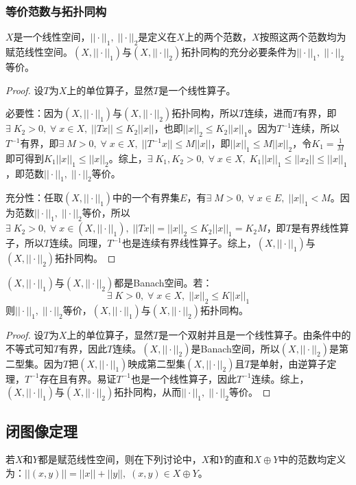 \subsubsection{等价范数与拓扑同构}
\begin{theorem}
	$X$是一个线性空间，$||\cdot||_1,\;||\cdot||_2$是定义在$X$上的两个范数，$X$按照这两个范数均为赋范线性空间。$(X,||\cdot||_1)$与$(X,||\cdot||_2)$拓扑同构的充分必要条件为$||\cdot||_1,\;||\cdot||_2$等价。
\end{theorem}
\begin{proof}
	设$T$为$X$上的单位算子，显然$T$是一个线性算子。\par
	必要性：因为$(X,||\cdot||_1)$与$(X,||\cdot||_2)$拓扑同构，所以$T$连续，进而$T$有界，即$\exists\;K_2>0,\;\forall\;x\in X,\;||Tx||\leqslant K_2||x||$，也即$||x||_2\leqslant K_2||x||_1$。因为$T^{-1}$连续，所以$T^{-1}$有界，即$\exists\;M>0,\;\forall\;x\in X,\;||T^{-1}x||\leqslant M||x||$，即$||x||_1\leqslant M||x||_2$，令$K_1=\frac{1}{M}$即可得到$K_1||x||_1\leqslant||x||_2$。综上，$\exists\;K_1,K_2>0,\;\forall\;x\in X,\;K_1||x||_1\leqslant||x_2||\leqslant||x||_1$，即范数$||\cdot||_1,\;||\cdot||_2$等价。\par
	充分性：任取$(X,||\cdot||_1)$中的一个有界集$E$，有$\exists\;M>0,\;\forall\;x\in E,\;||x||_1<M$。因为范数$||\cdot||_1,\;||\cdot||_2$等价，所以$\exists\;K_2>0,\;\forall\;x\in(X,||\cdot||_1),\;||Tx||=||x||_2\leqslant K_2||x||_1=K_2M$，即$T$是有界线性算子，所以$T$连续。同理，$T^{-1}$也是连续有界线性算子。综上，$(X,||\cdot||_1)$与$(X,||\cdot||_2)$拓扑同构。
\end{proof}
\begin{corollary}
	$(X,||\cdot||_1)$与$(X,||\cdot||_2)$都是Banach空间。若：
	\begin{equation*}
		\exists\;K>0,\;\forall\;x\in X,\;||x||_2\leqslant K||x||_1
	\end{equation*}
	则$||\cdot||_1,\;||\cdot||_2$等价，$(X,||\cdot||_1)$与$(X,||\cdot||_2)$拓扑同构。
\end{corollary}
\begin{proof}
	设$T$为$X$上的单位算子，显然$T$是一个双射并且是一个线性算子。由条件中的不等式可知$T$有界，因此$T$连续。$(X,||\cdot||_2)$是Banach空间，所以$(X,||\cdot||_2)$是第二型集。因为$T$把$(X,||\cdot||_1)$映成第二型集$(X,||\cdot||_2)$且$T$是单射，由逆算子定理，$T^{-1}$存在且有界。易证$T^{-1}$也是一个线性算子，因此$T^{-1}$连续。综上，$(X,||\cdot||_1)$与$(X,||\cdot||_2)$拓扑同构，从而$||\cdot||_1,\;||\cdot||_2$等价。
\end{proof}

\subsection{闭图像定理}
若$X$和$Y$都是赋范线性空间，则在下列讨论中，$X$和$Y$的直和$X\oplus Y$中的范数均定义为：$||(x,y)||=||x||+||y||,\;(x,y)\in X\oplus Y$。
